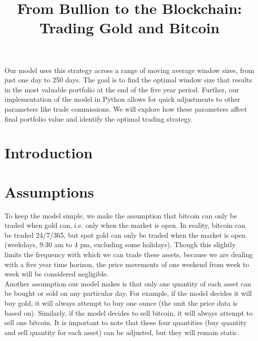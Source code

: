 \documentclass[12pt]{article}
\begin{document}
    Our model uses this strategy across a range of moving average window sizes, from just one day to 250 days. The goal is to find the optimal window size that results in the most valuable portfolio
    at the end of the five year period. Further, our implementation of the model in Python allows for quick adjustments to other parameters like trade commissions. We will explore how these parameters affect
    final portfolio value and identify the optimal trading strategy.


    

\clearpage
\pagestyle{fancy}
\tableofcontents
\newpage
\setcounter{page}{1}

\title{From Bullion to the Blockchain: Trading Gold and Bitcoin}
\maketitle


\section{Introduction}



\section{Assumptions}

To keep the model simple, we make the assumption that bitcoin can only be traded when gold can, i.e. only when the market is open.
In reality, bitcoin can be traded 24/7/365, but spot gold can only be traded when the market is open (weekdays, 9:30 am to 4 pm, excluding some holidays).
Though this slightly limits the frequency with which we can trade these assets, because we are dealing with a five year time horizon, the
price movements of one weekend from week to week will be considered negligible.
\\
Another assumption our model makes is that only one quantity of each asset can be bought or sold on any particular day. For example, if the model decides it will buy gold,
it will always attempt to buy one ounce (the unit the price data is based on). Similarly, if the model decides to sell bitcoin, it will always attempt to sell one bitcoin.
It is important to note that these four quantities (buy quantity and sell quantity for each asset) can be adjusted, but they will remain static.
\end{document}
